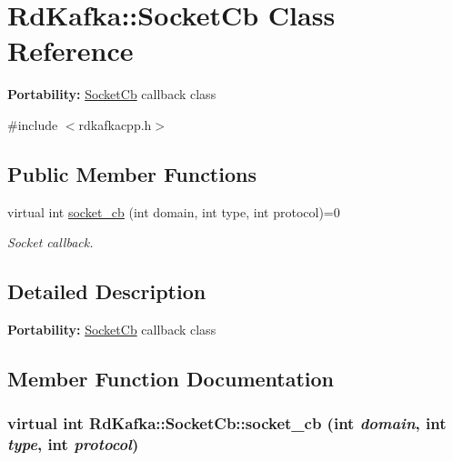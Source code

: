 \hypertarget{classRdKafka_1_1SocketCb}{
\section{RdKafka::SocketCb Class Reference}
\label{classRdKafka_1_1SocketCb}
}


{\bfseries Portability:} \hyperlink{classRdKafka_1_1SocketCb}{SocketCb} callback class  


{\ttfamily \#include $<$rdkafkacpp.h$>$}\subsection*{Public Member Functions}
\begin{DoxyCompactItemize}
\item 
virtual int \hyperlink{classRdKafka_1_1SocketCb_a60b5be4697eb7bd7e9dfae4f5cbc3401}{socket\_\-cb} (int domain, int type, int protocol)=0
\begin{DoxyCompactList}\small\item\em Socket callback. \item\end{DoxyCompactList}\end{DoxyCompactItemize}


\subsection{Detailed Description}
{\bfseries Portability:} \hyperlink{classRdKafka_1_1SocketCb}{SocketCb} callback class 

\subsection{Member Function Documentation}
\hypertarget{classRdKafka_1_1SocketCb_a60b5be4697eb7bd7e9dfae4f5cbc3401}{
\subsubsection[{socket\_\-cb}]{\setlength{\rightskip}{0pt plus 5cm}virtual int RdKafka::SocketCb::socket\_\-cb (int {\em domain}, \/  int {\em type}, \/  int {\em protocol})}}
\label{classRdKafka_1_1SocketCb_a60b5be4697eb7bd7e9dfae4f5cbc3401}


